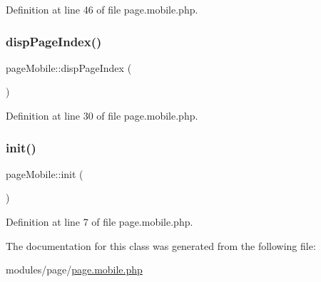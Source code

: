 Definition at line 46 of file page.\+mobile.\+php.

\hypertarget{classpageMobile_abefd2674d7ecf5462aaeb0194aac495a}{}\label{classpageMobile_abefd2674d7ecf5462aaeb0194aac495a} 
\subsubsection{\texorpdfstring{disp\+Page\+Index()}{dispPageIndex()}}
{\footnotesize\ttfamily page\+Mobile\+::disp\+Page\+Index (\begin{DoxyParamCaption}{ }\end{DoxyParamCaption})}



Definition at line 30 of file page.\+mobile.\+php.

\hypertarget{classpageMobile_a5dd50db2aed4a910e6dcd1178f55e9c1}{}\label{classpageMobile_a5dd50db2aed4a910e6dcd1178f55e9c1} 
\subsubsection{\texorpdfstring{init()}{init()}}
{\footnotesize\ttfamily page\+Mobile\+::init (\begin{DoxyParamCaption}{ }\end{DoxyParamCaption})}



Definition at line 7 of file page.\+mobile.\+php.



The documentation for this class was generated from the following file\+:\begin{DoxyCompactItemize}
\item 
modules/page/\hyperlink{page_8mobile_8php}{page.\+mobile.\+php}\end{DoxyCompactItemize}
